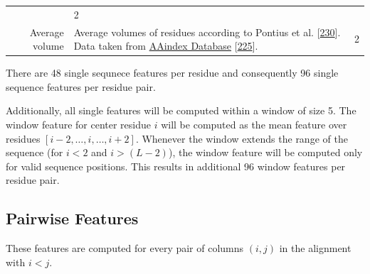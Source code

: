 \documentclass[11pt,a4paper,twoside]{book}
\theoremstyle{definition}
\theoremstyle{definition}
\theoremstyle{remark}
\begin{document}
\begin{longtable}[]{@{}rlc@{}}
\begin{minipage}[t]{0.50\columnwidth}
\end{minipage} & \begin{minipage}[t]{0.18\columnwidth}\centering\strut
2\strut
\end{minipage}\tabularnewline
\begin{minipage}[t]{0.23\columnwidth}\raggedleft\strut
Average volume\strut
\end{minipage} & \begin{minipage}[t]{0.50\columnwidth}\raggedright\strut
Average volumes of residues according to Pontius et al.
{[}\protect\hyperlink{ref-Pontius1996}{230}{]}. Data taken from
\href{http://www.genome.jp/dbget-bin/www_bget?aaindex:PONJ960101}{AAindex
Database} {[}\protect\hyperlink{ref-Kawashima2008}{225}{]}.\strut
\end{minipage} & \begin{minipage}[t]{0.18\columnwidth}\centering\strut
2\strut
\end{minipage}\tabularnewline
\bottomrule
\end{longtable}

There are 48 single sequnece features per residue and consequently 96
single sequence features per residue pair.

Additionally, all single features will be computed within a window of
size 5. The window feature for center residue \(i\) will be computed as
the mean feature over residues
\([i\!-\!2, \ldots, i, \ldots, i\!+\!2]\). Whenever the window extends
the range of the sequence (for \(i\!<\!2\) and \(i\!>\!(L-2)\)), the
window feature will be computed only for valid sequence positions. This
results in additional 96 window features per residue pair.

\subsection{Pairwise Features}\label{seq-features-pairwise}

These features are computed for every pair of columns \((i, j)\) in the
alignment with \(i<j\).
\end{document}
